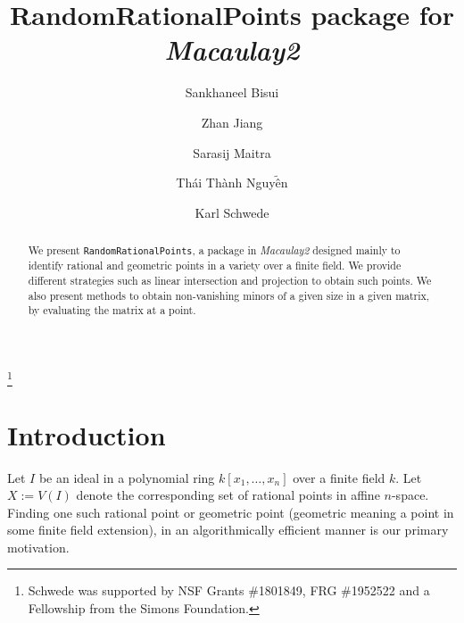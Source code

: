 \documentclass[11pt]{amsart}
\theoremstyle{definition}
\begin{document}
\title{{RandomRationalPoints} package for \emph{Macaulay2}}
\author{Sankhaneel Bisui}
\address{Department of Mathematics, Tulane University, New Orleans, LA 70118}
\author{Zhan Jiang}
\address{Department of Mathematics, University of Michigan, Ann Arbor, MI 48109}
\author{Sarasij Maitra}
\address{Department of Mathematics, University of Virginia, Charlottesville, VA 22904}
\author{Th\'ai Th\`anh Nguy$\tilde{\text{\^e}}$n}
\address{Department of Mathematics, Tulane University, New Orleans, LA 70118}
\author{Karl Schwede}
\address{Department of Mathematics, University of Utah, 155 S 1400 E Room 233, Salt Lake City, UT, 84112}

\thanks{Schwede was supported by NSF Grants \#1801849, FRG \#1952522 and a Fellowship from the Simons Foundation.}

\begin{abstract}
  We present {\tt RandomRationalPoints}, a package in \emph{Macaulay2} designed mainly to identify rational and geometric points in a variety over a finite field. We provide different strategies such as linear intersection and projection to obtain such points. We also present methods to obtain non-vanishing minors of a given size in a given matrix, by evaluating the matrix at a point.  %
\end{abstract}



\maketitle

\section{Introduction}
    Let $I$ be an ideal in a polynomial ring $k[x_1,\dots, x_n]$ over a finite field $k$. Let $X:=V(I)$ denote the corresponding set of rational points in affine $n$-space. Finding one such rational point or geometric point (geometric meaning a point in some finite field extension), in an algorithmically efficient manner is our primary motivation. 
\end{document}
